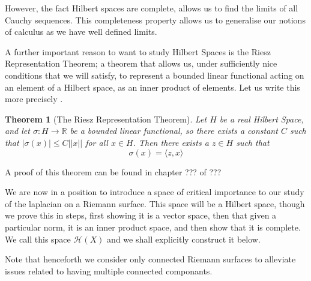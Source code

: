 \documentclass[a4paper,12pt]{report}
\theoremstyle{plain}
\newtheorem{thm}{Theorem}[section]
\theoremstyle{definition}
\newtheorem{defn}[thm]{Definition}
\begin{document}
However, the fact Hilbert spaces are complete, allows us to find the limits of all Cauchy sequences. This completeness property allows us to generalise our notions of calculus as we have well defined limits.

A further important reason to want to study Hilbert Spaces is the Riesz Representation Theorem; a theorem that allows us, under sufficiently nice conditions that we will satisfy, to represent a bounded linear functional acting on an element of a Hilbert space, as an inner product of elements. Let us write this more precisely .
\begin{thm}[The Riesz Representation Theorem]\label{RieszRepTheorem}
  Let $H$ be a real Hilbert Space, and let $\sigma \colon H \rightarrow \mathbb{R}$ be a bounded linear functional, so there exists a constant $C$ such that $|\sigma(x)| \leq C||x||$ for all $x \in H$. Then there exists a $z \in H$ such that \[ \sigma(x) = \langle z, x \rangle \]
\end{thm}
A proof of this theorem can be found in chapter ??? of ???

We are now in a position to introduce a space of critical importance to our study of the laplacian on a Riemann surface. This space will be a Hilbert space, though we prove this in steps, first showing it is a vector space, then that given a particular norm, it is an inner product space, and then show that it is complete. We call this space $\mathcal{H}(X)$ and we shall explicitly construct it below. 

Note that henceforth we consider only connected Riemann surfaces to alleviate  issues related to having multiple connected componants.


\end{document}
